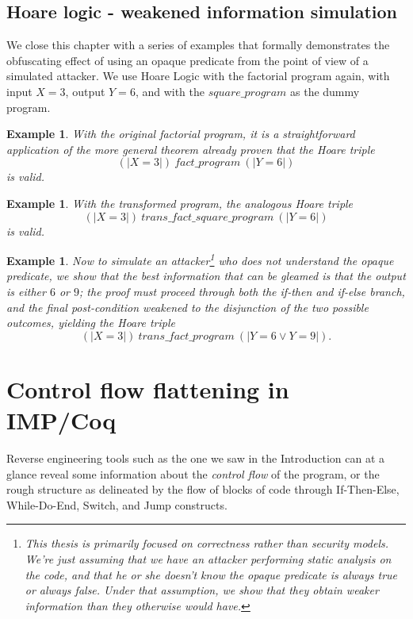 \documentclass[compsoc,conference,a4paper,10pt,times]{IEEEtran}
\newtheorem{example}[theorem]{Example}
\begin{document}
\subsection{Hoare logic - weakened information simulation}\label{weakened}

We close this chapter with a series of examples that formally demonstrates the obfuscating effect of using an opaque predicate from the point of view of a simulated attacker.  We use Hoare Logic with the factorial program again, with input $X=3$, output $Y=6$, and with the $square\_program$ as the dummy program.

\begin{example}\label{hoare21}
    With the original factorial program, it is a straightforward application of the more general theorem already proven that the Hoare triple \[(|X=3|)\ fact\_program\ (|Y=6|)\] is valid.
\end{example}

\begin{example}\label{hoare22}
With the transformed program, the analogous Hoare triple
\[(|X=3|)\ trans\_fact\_square\_program\ (|Y=6|)\]
is valid.
\end{example}

\begin{example}\label{hoare23}
Now to simulate an attacker\footnote{This thesis is primarily focused on correctness rather than security models.  We're just assuming that we have an attacker performing static analysis on the code, and that he or she doesn't know the opaque predicate is always true or always false.  Under that assumption, we show that they obtain weaker information than they otherwise would have.} who does not understand the opaque predicate, we show that the best information that can be gleamed is that the output is either $6$ or $9$; the proof must proceed through both the if-then and if-else branch, and the final post-condition weakened to the disjunction of the two possible outcomes, yielding the Hoare triple
\[
(|X=3|)\ trans\_fact\_program\ (|Y=6 \lor Y=9|).
\]
\end{example}

\section{Control flow flattening in IMP/Coq}\label{Ch4}
Reverse engineering tools such as the one we saw in the Introduction can at a glance reveal some information about the \emph{control flow} of the program, or the rough structure as delineated by the flow of blocks of code through If-Then-Else, While-Do-End, Switch, and Jump constructs.
\end{document}
